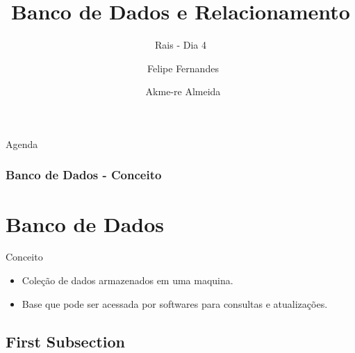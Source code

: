 \documentclass{beamer}
\title{Banco de Dados e Relacionamento}
\subtitle{Rais - Dia 4}
\author[Felipe e Akme-re]{~Felipe Fernandes \and ~Akme-re Almeida}
\institute[Fabsoft] %
{}
\date{}
\begin{document}
\begin{frame}

  \titlepage
  
\end{frame}

\begin{frame}{Agenda}

  \tableofcontents
\end{frame}
\begin{frame}[fragile]

\frametitle{Banco de Dados - Conceito}
\section{Banco de Dados}
\begin{block}{\LARGE Conceito}
	\begin{itemize}
		\item \LARGE Coleção de dados armazenados em uma maquina.
		\item \LARGE Base que pode ser acessada por softwares para consultas e atualizações.
	\end{itemize}
\end{block}

%  	
\end{frame}

\subsection{First Subsection}
\end{document}
